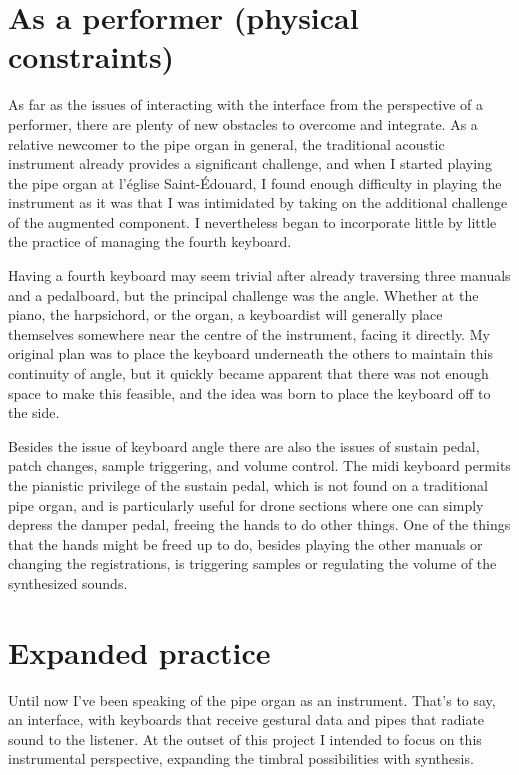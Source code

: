 \documentclass[12pt,twoside,maitrise]{dms_ks}
\theoremstyle{definition}
\begin{document}
{\section{As a performer (physical constraints)}

As far as the issues of interacting with the interface from the perspective of a performer, there are plenty of new obstacles to overcome and integrate. 
As a relative newcomer to the pipe organ in general, the traditional acoustic instrument already provides a significant challenge, and when I started playing the pipe organ at l’église Saint-Édouard, I found enough difficulty in playing the instrument as it was that I was intimidated by taking on the additional challenge of the augmented component. 
I nevertheless began to incorporate little by little the practice of managing the fourth keyboard. 

Having a fourth keyboard may seem trivial after already traversing three manuals and a pedalboard, but the principal challenge was the angle. 
Whether at the piano, the harpsichord, or the organ, a keyboardist will generally place themselves somewhere near the centre of the instrument, facing it directly. 
My original plan was to place the keyboard underneath the others to maintain this continuity of angle, but it quickly became apparent that there was not enough space to make this feasible, and the idea was born to place the keyboard off to the side. 

Besides the issue of keyboard angle there are also the issues of sustain pedal, patch changes, sample triggering, and volume control. 
The midi keyboard permits the pianistic privilege of the sustain pedal, which is not found on a traditional pipe organ, and is particularly useful for drone sections where one can simply depress the damper pedal, freeing the hands to do other things. 
One of the things that the hands might be freed up to do, besides playing the other manuals or changing the registrations, is triggering samples or regulating the volume of the synthesized sounds. 

\section{Expanded practice}

Until now I've been speaking of the pipe organ as an instrument. 
That's to say, an interface, with keyboards that receive gestural data and pipes that radiate sound to the listener. 
At the outset of this project I intended to focus on this instrumental perspective, expanding the timbral possibilities with synthesis.

}
\end{document}
